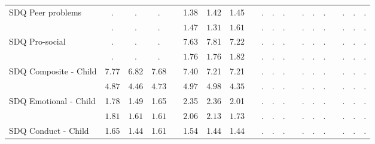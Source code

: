 \begin{center}
{\begin{longtable}{L{5cm} c c c p{.5cm} c c c p{.5cm} c c c p{.5cm} c c c p{.5cm} c c c}
SDQ Peer problems & . &         . &         . & &      1.38 &      1.42 &      1.45 & &         . &         . &         . & &         . &         . &         . & &         . &         . &         . \\*
& $\mathit{        .}$ & $\mathit{        .}$ & $\mathit{        .}$ & & $\mathit{     1.47}$ & $\mathit{     1.31}$ & $\mathit{     1.61}$ & & $\mathit{        .}$ & $\mathit{        .}$ & $\mathit{        .}$ & & $\mathit{        .}$ & $\mathit{        .}$ & $\mathit{        .}$ & & $\mathit{        .}$ & $\mathit{        .}$ & $\mathit{        .}$ \\[.7em]
SDQ Pro-social & . &         . &         . & &      7.63 &      7.81 &      7.22 & &         . &         . &         . & &         . &         . &         . & &         . &         . &         . \\*
& $\mathit{        .}$ & $\mathit{        .}$ & $\mathit{        .}$ & & $\mathit{     1.76}$ & $\mathit{     1.76}$ & $\mathit{     1.82}$ & & $\mathit{        .}$ & $\mathit{        .}$ & $\mathit{        .}$ & & $\mathit{        .}$ & $\mathit{        .}$ & $\mathit{        .}$ & & $\mathit{        .}$ & $\mathit{        .}$ & $\mathit{        .}$ \\[.7em]
SDQ Composite - Child & 7.77 &      6.82 &      7.68 & &      7.40 &      7.21 &      7.21 & &         . &         . &         . & &         . &         . &         . & &         . &         . &         . \\*
& $\mathit{     4.87}$ & $\mathit{     4.46}$ & $\mathit{     4.73}$ & & $\mathit{     4.97}$ & $\mathit{     4.98}$ & $\mathit{     4.35}$ & & $\mathit{        .}$ & $\mathit{        .}$ & $\mathit{        .}$ & & $\mathit{        .}$ & $\mathit{        .}$ & $\mathit{        .}$ & & $\mathit{        .}$ & $\mathit{        .}$ & $\mathit{        .}$ \\[.7em]
SDQ Emotional - Child & 1.78 &      1.49 &      1.65 & &      2.35 &      2.36 &      2.01 & &         . &         . &         . & &         . &         . &         . & &         . &         . &         . \\*
& $\mathit{     1.81}$ & $\mathit{     1.61}$ & $\mathit{     1.61}$ & & $\mathit{     2.06}$ & $\mathit{     2.13}$ & $\mathit{     1.73}$ & & $\mathit{        .}$ & $\mathit{        .}$ & $\mathit{        .}$ & & $\mathit{        .}$ & $\mathit{        .}$ & $\mathit{        .}$ & & $\mathit{        .}$ & $\mathit{        .}$ & $\mathit{        .}$ \\[.7em]
SDQ Conduct - Child & 1.65 &      1.44 &      1.61 & &      1.54 &      1.44 &      1.44 & &         . &         . &         . & &         . &         . &         . & &         . &         . &         . \\*

\end{longtable}}
\end{center}
